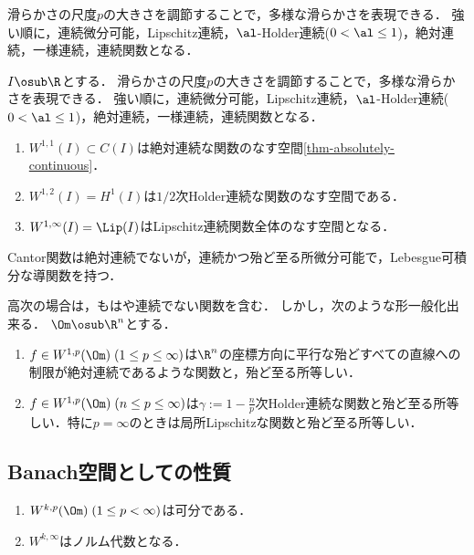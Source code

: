 \documentclass[uplatex,dvipdfmx]{jsreport}
\begin{document}
\begin{tcolorbox}[colframe=ForestGreen, colback=ForestGreen!10!white,breakable,colbacktitle=ForestGreen!40!white,coltitle=black,fonttitle=\bfseries\sffamily,
title=]
    滑らかさの尺度$p$の大きさを調節することで，多様な滑らかさを表現できる．
    強い順に，連続微分可能，Lipschitz連続，$\al$-Holder連続($0<\al\le 1$)，絶対連続，一様連続，連続関数となる．
\end{tcolorbox}

\begin{example}[一次元の場合]
    $I\osub\R$とする．
    滑らかさの尺度$p$の大きさを調節することで，多様な滑らかさを表現できる．
    強い順に，連続微分可能，Lipschitz連続，$\al$-Holder連続($0<\al\le 1$)，絶対連続，一様連続，連続関数となる．
    \begin{enumerate}
        \item $W^{1,1}(I)\subset C(I)$は絶対連続な関数のなす空間\ref{thm-absolutely-continuous}．
        \item $W^{1,2}(I)=H^1(I)$は$1/2$次Holder連続な関数のなす空間である．
        \item $W^{1,\infty}(I)=\Lip(I)$はLipschitz連続関数全体のなす空間となる．
    \end{enumerate}
    Cantor関数は絶対連続でないが，連続かつ殆ど至る所微分可能で，Lebesgue可積分な導関数を持つ．
\end{example}

\begin{proposition}
    高次の場合は，もはや連続でない関数を含む．
    しかし，次のような形一般化出来る．
    $\Om\osub\R^n$とする．
    \begin{enumerate}
        \item $f\in W^{1,p}(\Om)\;(1\le p\le\infty)$は$\R^n$の座標方向に平行な殆どすべての直線への制限が絶対連続であるような関数と，殆ど至る所等しい．
        \item $f\in W^{1,p}(\Om)\;(n\le p\le\infty)$は$\gamma:=1-\frac{n}{p}$次Holder連続な関数と殆ど至る所等しい．特に$p=\infty$のときは局所Lipschitzな関数と殆ど至る所等しい．
    \end{enumerate}
\end{proposition}

\subsection{Banach空間としての性質}

\begin{proposition}\mbox{}
    \begin{enumerate}
        \item $W^{k,p}(\Om)\;(1\le p<\infty)$は可分である．
        \item $W^{k,\infty}$はノルム代数となる．
    \end{enumerate}
\end{proposition}
\end{document}
